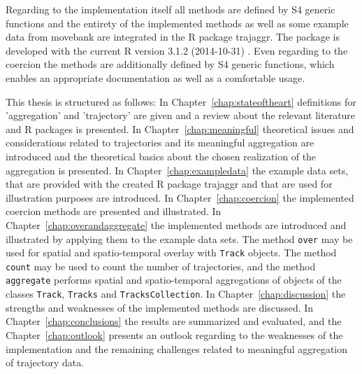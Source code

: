 \documentclass[12pt, oneside, a4paper]{scrbook}
\newcommand{\pkg}[1]{{\normalfont\fontseries{b}\selectfont #1}}
\let\proglang=\textsf
\let\code=\texttt
\begin{document}
Regarding to the implementation itself all methods are defined by S4 generic functions and the entirety of the implemented methods as well as some example data from movebank are integrated in the \proglang{R} package \pkg{trajaggr}.  The package is developed with the current \proglang{R} version 3.1.2 (2014-10-31) \citep{r_development_core_team_r:_2014}. Even regarding to the coercion the methods are additionally defined by S4 generic functions, which enables an appropriate documentation as well as a comfortable usage.
\par\medskip




This thesis is structured as follows: In Chapter~\ref{chap:stateoftheart} definitions for 'aggregation' and 'trajectory' are given and a review about the relevant literature and \proglang{R} packages is presented. In Chapter~\ref{chap:meaningful} theoretical issues and considerations related to trajectories and its meaningful aggregation are introduced and the theoretical basics about the chosen realization of the aggregation is presented. In Chapter~\ref{chap:exampledata} the example data sets, that are provided with the created \proglang{R} package \pkg{trajaggr} and that are used for illustration purposes are introduced. In Chapter~\ref{chap:coercion} the implemented coercion methods are presented and illustrated. In Chapter~\ref{chap:overandaggregate} the implemented methods are introduced and illustrated by applying them to the example data sets. The method \code{over} may be used for spatial and spatio-temporal overlay with \code{Track} objects. The method \code{count} may be used to count the number of trajectories, and the method \code{aggregate} performs spatial and spatio-temporal aggregations of objects of the classes \code{Track}, \code{Tracks} and \code{TracksCollection}. In Chapter~\ref{chap:discussion} the strengths and weaknesses of the implemented methods are discussed. In Chapter~\ref{chap:conclusions} the results are summarized and evaluated, and the Chapter~\ref{chap:outlook} presents an outlook regarding to the weaknesses of the implementation and the remaining challenges related to meaningful aggregation of trajectory data.
\par\medskip
\end{document}
